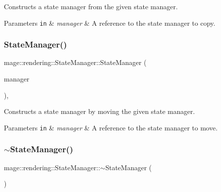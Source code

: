 Constructs a state manager from the given state manager.


\begin{DoxyParams}[1]{Parameters}
\mbox{\tt in}  & {\em manager} & A reference to the state manager to copy. \\
\hline
\end{DoxyParams}
\hypertarget{classmage_1_1rendering_1_1_state_manager_ab5a87ec8d14f9b249685b52e159888b2}{}\label{classmage_1_1rendering_1_1_state_manager_ab5a87ec8d14f9b249685b52e159888b2} 
\subsubsection{\texorpdfstring{State\+Manager()}{StateManager()}\hspace{0.1cm}{\footnotesize\ttfamily [3/3]}}
{\footnotesize\ttfamily mage\+::rendering\+::\+State\+Manager\+::\+State\+Manager (\begin{DoxyParamCaption}\item[{\hyperlink{classmage_1_1rendering_1_1_state_manager}{State\+Manager} \&\&}]{manager }\end{DoxyParamCaption})\hspace{0.3cm}{\ttfamily [default]}, {\ttfamily [noexcept]}}

Constructs a state manager by moving the given state manager.


\begin{DoxyParams}[1]{Parameters}
\mbox{\tt in}  & {\em manager} & A reference to the state manager to move. \\
\hline
\end{DoxyParams}
\hypertarget{classmage_1_1rendering_1_1_state_manager_a774d3147717773d6dce1f388bc960f87}{}\label{classmage_1_1rendering_1_1_state_manager_a774d3147717773d6dce1f388bc960f87} 
\subsubsection{\texorpdfstring{$\sim$\+State\+Manager()}{~StateManager()}}
{\footnotesize\ttfamily mage\+::rendering\+::\+State\+Manager\+::$\sim$\+State\+Manager (\begin{DoxyParamCaption}{ }\end{DoxyParamCaption})\hspace{0.3cm}{\ttfamily [default]}}


